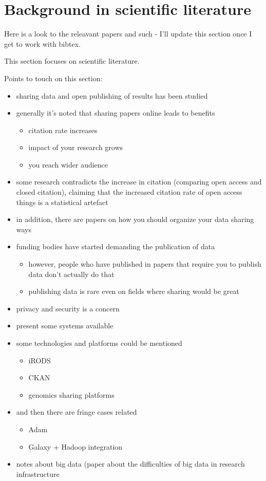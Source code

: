 \chapter{Background in scientific literature}
\label{chapter:background} 

Here is a look to the releavant papers and such - I'll update this section once
I get to work with bibtex.

This section focuses on scientific literature.

Points to touch on this section:

\begin{itemize}
    \item sharing data and open publishing of results has been studied
    \item generally it's noted that sharing papers online leads to benefits
    \begin{itemize}
        \item citation rate increases
        \item impact of your research grows
        \item you reach wider audience
    \end{itemize}
    \item some research contradicts the increase in citation (comparing open
          access and closed citation), claiming that the increased citation
          rate of open access things is a statistical artefact
    \item in addition, there are papers on how you should organize your data
          sharing ways
    \item funding bodies have started demanding the publication of data
    \begin{itemize}
        \item however, people who have published in papers that require you
              to publish data don't actually do that
        \item publishing data is rare even on fields where sharing would be
              great
    \end{itemize}
    \item privacy and security is a concern
    \item present some systems available
    \item some technologies and platforms could be mentioned
    \begin{itemize}
        \item iRODS
        \item CKAN
        \item genomics sharing platforms
    \end{itemize}
    \item and then there are fringe cases related
    \begin{itemize}
        \item Adam
        \item Galaxy + Hadoop integration
    \end{itemize}
    \item notes about big data (paper about the difficulties of big data in
          research infrastructure
\end{itemize}

